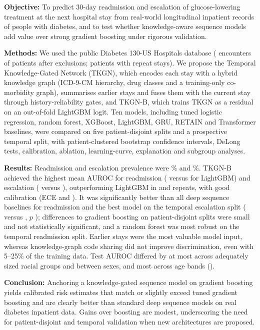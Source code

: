 \textbf{Objective:} To predict 30-day readmission and escalation of
glucose-lowering treatment at the next hospital stay from real-world
longitudinal inpatient records of people with diabetes, and to test whether
knowledge-aware sequence models add value over strong gradient boosting under
rigorous validation.

\textbf{Methods:} We used the public Diabetes 130-US Hospitals database
(\NEnc{} encounters of \NPat{} patients after exclusions; \NRepeat{} patients
with repeat stays). We propose the Temporal Knowledge-Gated Network (TKGN),
which encodes each stay with a hybrid knowledge graph (ICD-9-CM hierarchy,
drug classes and a training-only co-morbidity graph), summarises earlier
stays and fuses them with the current stay through history-reliability
gates, and TKGN-B, which trains TKGN as a residual on an out-of-fold
LightGBM logit. Ten models, including tuned logistic regression, random
forest, XGBoost, LightGBM, GRU, RETAIN and Transformer baselines, were
compared on five patient-disjoint splits and a prospective temporal split,
with patient-clustered bootstrap confidence intervals, DeLong tests,
calibration, ablation, learning-curve, explanation and subgroup analyses.

\textbf{Results:} Readmission and escalation prevalence were
\RateReadmit\% and \RateEsc\%. TKGN-B achieved the highest mean AUROC for
readmission (\AucReadmitGrpTKGNB{} versus \AucReadmitGrpLGBM{} for LightGBM)
and escalation (\AucEscGrpTKGNB{} versus \AucEscGrpLGBM{}), outperforming
LightGBM in \WinsReadmitLGBM{} and \WinsEscLGBM{} repeats, with good
calibration (ECE \EceReadmitGrpTKGNB{} and \EceEscGrpTKGNB{}). It was
significantly better than all deep sequence baselines for readmission and
the best model on the temporal escalation split (\AucEscTmpTKGNB{} versus
\AucEscTmpLGBM{}, $p$ \PDelongTmpEscLGBM{}); differences to gradient boosting on
patient-disjoint splits were small and not statistically significant, and a
random forest was most robust on the temporal readmission split.
Earlier stays were the most valuable model input, whereas knowledge-graph
code sharing did not improve discrimination, even with 5--25\% of the
training data.
Test AUROC differed by at most \GapReadmitRace{} across adequately sized
racial groups and \GapReadmitGender{} between sexes, and most across age
bands (\GapReadmitAge{}).

\textbf{Conclusion:} Anchoring a knowledge-gated sequence model on gradient
boosting yields calibrated risk estimates that match or slightly exceed tuned
gradient boosting and are clearly better than standard deep sequence models
on real diabetes inpatient data. Gains over boosting are modest,
underscoring the need for patient-disjoint and temporal validation when new
architectures are proposed.
